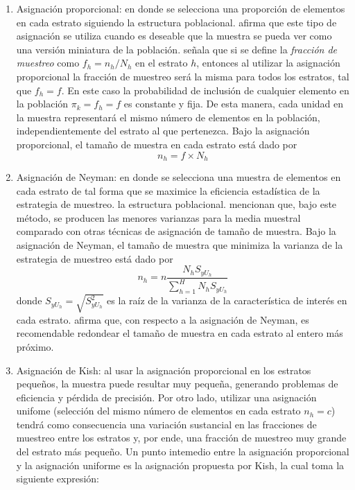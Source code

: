 \documentclass[
  12pt,
]{book}
\begin{document}
\begin{enumerate}
\def\labelenumi{\arabic{enumi}.}
\item
  Asignación proporcional: en donde se selecciona una proporción de elementos en cada estrato siguiendo la estructura poblacional. \citet{Lohr_2019} afirma que este tipo de asignación se utiliza cuando es deseable que la muestra se pueda ver como una versión miniatura de la población. \citet{Gutierrez_2016} señala que si se define la \emph{fracción de muestreo} como \(f_h=n_h/N_h\) en el estrato \(h\), entonces al utilizar la asignación proporcional la fracción de muestreo será la misma para todos los estratos, tal que \(f_h=f\). En este caso la probabilidad de inclusión de cualquier elemento en la población \(\pi_k=f_h=f\) es constante y fija. De esta manera, cada unidad en la muestra representará el mismo número de elementos en la población, independientemente del estrato al que pertenezca. Bajo la asignación proporcional, el tamaño de muestra en cada estrato está dado por
  \[
  n_h=f \times N_h
  \]
\item
  Asignación de Neyman: en donde se selecciona una muestra de elementos en cada estrato de tal forma que se maximice la eficiencia estadística de la estrategia de muestreo. la estructura poblacional. \citet{Groves_Fowler_Couper_Lepkowski_Singer_Tourangeau_2009} mencionan que, bajo este método, se producen las menores varianzas para la media muestral comparado con otras técnicas de asignación de tamaño de muestra. Bajo la asignación de Neyman, el tamaño de muestra que minimiza la varianza de la estrategia de muestreo está dado por
  \[
  n_h=n\dfrac{N_hS_{yU_h}}{\sum_{h=1}^HN_hS_{yU_h}}
  \]
  donde \(S_{yU_h}=\sqrt{S_{yU_h}^2}\) es la raíz de la varianza de la característica de interés en cada estrato. \citet{Gutierrez_2016} afirma que, con respecto a la asignación de Neyman, es recomendable redondear el tamaño de muestra en cada estrato al entero más próximo.
\item
  Asignación de Kish: al usar la asignación proporcional en los estratos pequeños, la muestra puede resultar muy pequeña, generando problemas de eficiencia y pérdida de precisión. Por otro lado, utilizar una asignación unifome (selección del mismo número de elementos en cada estrato \(n_h = c\)) tendrá como consecuencia una variación sustancial en las fracciones de muestreo entre los estratos y, por ende, una fracción de muestreo muy grande del estrato más pequeño. Un punto intemedio entre la asignación proporcional y la asignación uniforme es la asignación propuesta por Kish, la cual toma la siguiente expresión:
\end{enumerate}
\end{document}
